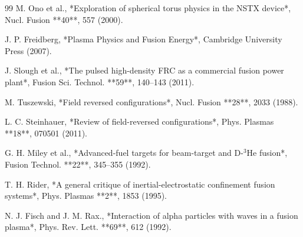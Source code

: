 \documentclass[10pt,twocolumn]{article}
\begin{document}
\begin{thebibliography}{99}
 M. Ono et al., *Exploration of spherical torus physics in the NSTX device*, Nucl. Fusion **40**, 557 (2000).

 J. P. Freidberg, *Plasma Physics and Fusion Energy*, Cambridge University Press (2007).

 J. Slough et al., *The pulsed high-density FRC as a commercial fusion power plant*, Fusion Sci. Technol. **59**, 140–143 (2011).

 M. Tuszewski, *Field reversed configurations*, Nucl. Fusion **28**, 2033 (1988).

 L. C. Steinhauer, *Review of field-reversed configurations*, Phys. Plasmas **18**, 070501 (2011).

 G. H. Miley et al., *Advanced-fuel targets for beam-target and D-$^3$He fusion*, Fusion Technol. **22**, 345–355 (1992).

 T. H. Rider, *A general critique of inertial-electrostatic confinement fusion systems*, Phys. Plasmas **2**, 1853 (1995).

 N. J. Fisch and J. M. Rax., *Interaction of alpha particles with waves in a fusion plasma*, Phys. Rev. Lett. **69**, 612 (1992).
\end{thebibliography}
\end{document}
